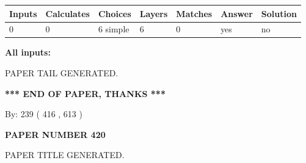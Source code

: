 \documentclass[12pt]{article}
\begin{document}
   
   
   
\noindent\begin{tabular}{|l|l|l|l|l|l|l|}
 \hline
Inputs & Calculates & Choices & Layers & Matches & Answer & Solution \\ \hline
 0  & 
 0  & 
 6
  simple  
  & 
 6  & 
 0  & 
  yes & 
  no 
  \\ \hline
 \end{tabular}
   
   
   
   
\noindent{}
   
   
   
   
\noindent\vspace{0.1in}\hspace{-0.08in} {\textbf{\Large{All inputs: }}}
   
   
   
   
   
   
 \vspace{0.2in}
 
   
   
\vspace{2.0in} PAPER TAIL GENERATED.
   
   
   
   
\vspace{1.0in} 
{\textbf{\large{ *** END OF PAPER, THANKS *** }}} 
   
   
\hspace{1.0in} By: 
 239 ( 416 ,  613 )
   
   
   
   
\newpage 
\setcounter{page}{ 
   420001 } 
   
   
   
   
 {\textbf{ \Large{ PAPER NUMBER  420  }}}
   
   
\vspace{0.2in}
   
   
   
   
   
   
   
   
 \vspace{0.2in}
 
 
 
 
   
   
 PAPER TITLE GENERATED.
   
   
   
\end{document}
